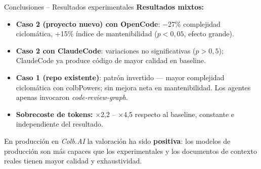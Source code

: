 \documentclass[t]{beamer}
\begin{document}
\begin{frame}{Conclusiones -- Resultados experimentales}
    \textbf{Resultados mixtos:}
    \vspace{0.1cm}
    \begin{itemize}
        \item \textbf{Caso 2 (proyecto nuevo) con OpenCode}: $-$27\% complejidad ciclomática, $+$15\% índice de mantenibilidad ($p < 0{,}05$, efecto grande).
        \vspace{0.05cm}
        \item \textbf{Caso 2 con ClaudeCode}: variaciones no significativas ($p > 0{,}5$); ClaudeCode ya produce código de mayor calidad en baseline.
        \vspace{0.05cm}
        \item \textbf{Caso 1 (repo existente)}: patrón invertido --- mayor complejidad ciclomática con colbPowers; sin mejora neta en mantenibilidad. Los agentes apenas invocaron \textit{code-review-graph}.
        \vspace{0.05cm}
        \item \textbf{Sobrecoste de tokens:} $\times$2,2 -- $\times$4,5 respecto al baseline, constante e independiente del resultado.
    \end{itemize}
    \vspace{0.1cm}
    \footnotesize En producción en \textit{Colb.AI} la valoración ha sido \textbf{positiva}: los modelos de producción son más capaces que los experimentales y los documentos de contexto reales tienen mayor calidad y exhaustividad.
\end{frame}
\end{document}
